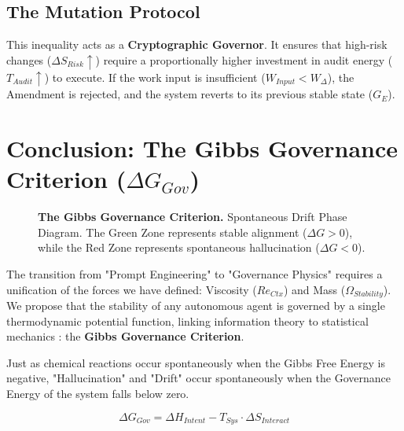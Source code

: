 \documentclass[11pt, a4paper]{article}
\newcommand{\Ge}{G_E}
\newcommand{\ReCtx}{Re_{Ctx}}
\newcommand{\OmegaStab}{\Omega_{Stability}}
\begin{document}
\subsection{The Mutation Protocol}

This inequality acts as a \textbf{Cryptographic Governor}. It ensures that high-risk changes ($\Delta S_{Risk} \uparrow$) require a proportionally higher investment in audit energy ($T_{Audit} \uparrow$) to execute. If the work input is insufficient ($W_{Input} < W_{\Delta}$), the Amendment is rejected, and the system reverts to its previous stable state ($\Ge$).

\section{Conclusion: The Gibbs Governance Criterion ($\Delta G_{Gov}$)}
\label{sec:gibbs_criterion}

\begin{figure}[t!]
    \centering
    \resizebox{0.71\textwidth}{!}{}
    \caption[\textbf{The Gibbs Governance Criterion.}]{\textbf{The Gibbs Governance Criterion.} Spontaneous Drift Phase Diagram. The Green Zone represents stable alignment ($\Delta G > 0$), while the Red Zone represents spontaneous hallucination ($\Delta G < 0$).}
    \label{fig:gibbs_criterion}
\end{figure}

The transition from "Prompt Engineering" to "Governance Physics" requires a unification of the forces we have defined: Viscosity ($\ReCtx$) and Mass ($\OmegaStab$). We propose that the stability of any autonomous agent is governed by a single thermodynamic potential function, linking information theory to statistical mechanics \cite{jaynes1957}: the \textbf{Gibbs Governance Criterion}.

Just as chemical reactions occur spontaneously when the Gibbs Free Energy is negative, "Hallucination" and "Drift" occur spontaneously when the Governance Energy of the system falls below zero.

\begin{equation}
    \label{eq:gibbs_governance}
    \Delta G_{Gov} = \Delta H_{Intent} - T_{Sys} \cdot \Delta S_{Interact}
\end{equation}
\end{document}

